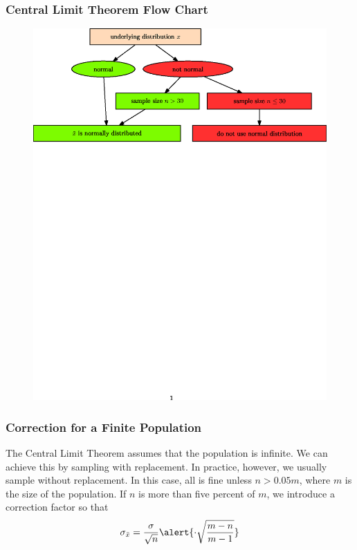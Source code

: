 \documentclass[xcolor=dvipsnames]{beamer}
\begin{document}
\begin{frame}
  \frametitle{Central Limit Theorem Flow Chart}
\begin{figure}[h]
\includegraphics[scale=.7]{./diagrams/CentralLimitTheorem.eps}
\end{figure}
\end{frame}

\begin{frame}
  \frametitle{Correction for a Finite Population}
The Central Limit Theorem assumes that the population is infinite. We
can achieve this by sampling with replacement. In practice, however,
we usually sample without replacement. In this case, all is fine
unless $n>0.05m$, where $m$ is the size of the population. If $n$ is
more than five percent of $m$, we introduce a correction factor so
that
\begin{equation}
  \label{eq:ungeihay}
  \sigma_{\bar{x}}=\frac{\sigma}{\sqrt{n}}\alert{\cdot\sqrt{\frac{m-n}{m-1}}}
\end{equation}

\end{frame}
\end{document}
